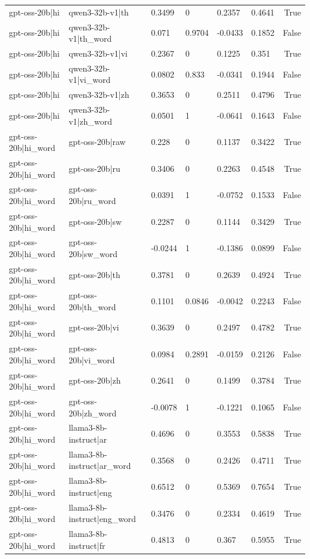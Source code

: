 \begin{table}
\begin{tabular}{llllllr}
gpt-oss-20b|hi & qwen3-32b-v1|th & 0.3499 & 0 & 0.2357 & 0.4641 & True \\
gpt-oss-20b|hi & qwen3-32b-v1|th_word & 0.071 & 0.9704 & -0.0433 & 0.1852 & False \\
gpt-oss-20b|hi & qwen3-32b-v1|vi & 0.2367 & 0 & 0.1225 & 0.351 & True \\
gpt-oss-20b|hi & qwen3-32b-v1|vi_word & 0.0802 & 0.833 & -0.0341 & 0.1944 & False \\
gpt-oss-20b|hi & qwen3-32b-v1|zh & 0.3653 & 0 & 0.2511 & 0.4796 & True \\
gpt-oss-20b|hi & qwen3-32b-v1|zh_word & 0.0501 & 1 & -0.0641 & 0.1643 & False \\
gpt-oss-20b|hi_word & gpt-oss-20b|raw & 0.228 & 0 & 0.1137 & 0.3422 & True \\
gpt-oss-20b|hi_word & gpt-oss-20b|ru & 0.3406 & 0 & 0.2263 & 0.4548 & True \\
gpt-oss-20b|hi_word & gpt-oss-20b|ru_word & 0.0391 & 1 & -0.0752 & 0.1533 & False \\
gpt-oss-20b|hi_word & gpt-oss-20b|sw & 0.2287 & 0 & 0.1144 & 0.3429 & True \\
gpt-oss-20b|hi_word & gpt-oss-20b|sw_word & -0.0244 & 1 & -0.1386 & 0.0899 & False \\
gpt-oss-20b|hi_word & gpt-oss-20b|th & 0.3781 & 0 & 0.2639 & 0.4924 & True \\
gpt-oss-20b|hi_word & gpt-oss-20b|th_word & 0.1101 & 0.0846 & -0.0042 & 0.2243 & False \\
gpt-oss-20b|hi_word & gpt-oss-20b|vi & 0.3639 & 0 & 0.2497 & 0.4782 & True \\
gpt-oss-20b|hi_word & gpt-oss-20b|vi_word & 0.0984 & 0.2891 & -0.0159 & 0.2126 & False \\
gpt-oss-20b|hi_word & gpt-oss-20b|zh & 0.2641 & 0 & 0.1499 & 0.3784 & True \\
gpt-oss-20b|hi_word & gpt-oss-20b|zh_word & -0.0078 & 1 & -0.1221 & 0.1065 & False \\
gpt-oss-20b|hi_word & llama3-8b-instruct|ar & 0.4696 & 0 & 0.3553 & 0.5838 & True \\
gpt-oss-20b|hi_word & llama3-8b-instruct|ar_word & 0.3568 & 0 & 0.2426 & 0.4711 & True \\
gpt-oss-20b|hi_word & llama3-8b-instruct|eng & 0.6512 & 0 & 0.5369 & 0.7654 & True \\
gpt-oss-20b|hi_word & llama3-8b-instruct|eng_word & 0.3476 & 0 & 0.2334 & 0.4619 & True \\
gpt-oss-20b|hi_word & llama3-8b-instruct|fr & 0.4813 & 0 & 0.367 & 0.5955 & True \\

\end{tabular}
\end{table}
